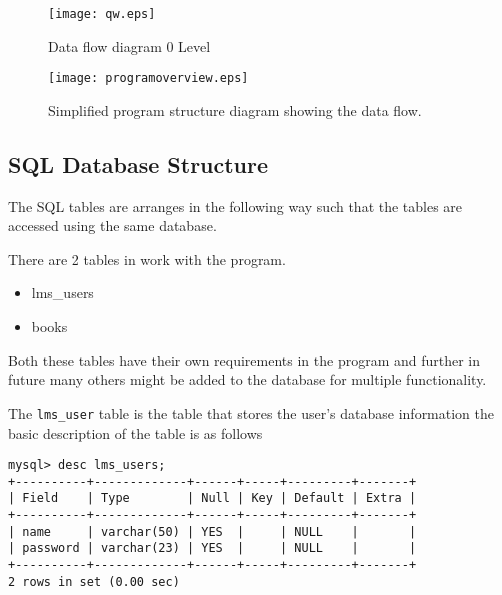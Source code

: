 \documentclass[12pt, a4paper, titlepage, openany]{report}
\begin{document}
\begin{figure}
\centering
\texttt{[image: qw.eps]}
\caption{Data flow diagram 0 Level}
\end{figure}
\begin{figure}
\centering
\texttt{[image: programoverview.eps]}
\caption{Simplified program structure diagram showing the data flow.}
\end{figure}
\newpage

\subsection{SQL Database Structure}
The SQL tables are arranges in the following way such that the tables are accessed using the same database.

There are 2 tables in work with the program.
\begin{itemize}
\item lms\_users
\item books
\end{itemize} 

Both these tables have their own requirements in the program and further in future many others might be added to the database for multiple functionality.

The \verb+lms_user+ table is the table that stores the user's database information the basic description of the table is as follows
\begin{verbatim}
mysql> desc lms_users;
+----------+-------------+------+-----+---------+-------+
| Field    | Type        | Null | Key | Default | Extra |
+----------+-------------+------+-----+---------+-------+
| name     | varchar(50) | YES  |     | NULL    |       |
| password | varchar(23) | YES  |     | NULL    |       |
+----------+-------------+------+-----+---------+-------+
2 rows in set (0.00 sec)
\end{verbatim}
\end{document}
